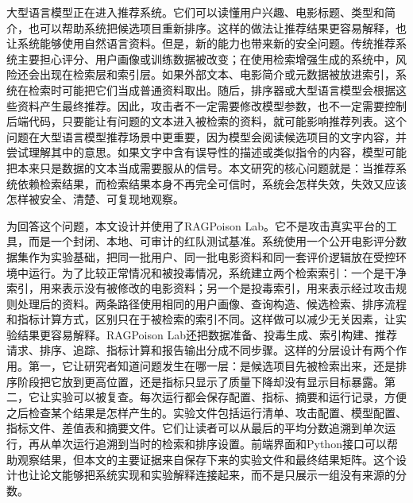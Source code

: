 大型语言模型正在进入推荐系统。它们可以读懂用户兴趣、电影标题、类型和简介，也可以帮助系统把候选项目重新排序。这样的做法让推荐结果更容易解释，也让系统能够使用自然语言资料。但是，新的能力也带来新的安全问题。传统推荐系统主要担心评分、用户画像或训练数据被改变；在使用检索增强生成的系统中，风险还会出现在检索层和索引层。如果外部文本、电影简介或元数据被放进索引，系统在检索时可能把它们当成普通资料取出。随后，排序器或大型语言模型会根据这些资料产生最终推荐。因此，攻击者不一定需要修改模型参数，也不一定需要控制后端代码，只要能让有问题的文本进入被检索的资料，就可能影响推荐列表。这个问题在大型语言模型推荐场景中更重要，因为模型会阅读候选项目的文字内容，并尝试理解其中的意思。如果文字中含有误导性的描述或类似指令的内容，模型可能把本来只是数据的文本当成需要服从的信号。本文研究的核心问题就是：当推荐系统依赖检索结果，而检索结果本身不再完全可信时，系统会怎样失效，失效又应该怎样被安全、清楚、可复现地观察。

为回答这个问题，本文设计并使用了RAGPoison Lab。它不是攻击真实平台的工具，而是一个封闭、本地、可审计的红队测试基准。系统使用一个公开电影评分数据集作为实验基础，把同一批用户、同一批电影资料和同一套评价逻辑放在受控环境中运行。为了比较正常情况和被投毒情况，系统建立两个检索索引：一个是干净索引，用来表示没有被修改的电影资料；另一个是投毒索引，用来表示经过攻击规则处理后的资料。两条路径使用相同的用户画像、查询构造、候选检索、排序流程和指标计算方式，区别只在于被检索的索引不同。这样做可以减少无关因素，让实验结果更容易解释。RAGPoison Lab还把数据准备、投毒生成、索引构建、推荐请求、排序、追踪、指标计算和报告输出分成不同步骤。这样的分层设计有两个作用。第一，它让研究者知道问题发生在哪一层：是候选项目先被检索出来，还是排序阶段把它放到更高位置，还是指标只显示了质量下降却没有显示目标暴露。第二，它让实验可以被复查。每次运行都会保存配置、指标、摘要和运行记录，方便之后检查某个结果是怎样产生的。实验文件包括运行清单、攻击配置、模型配置、指标文件、差值表和摘要文件。它们让读者可以从最后的平均分数追溯到单次运行，再从单次运行追溯到当时的检索和排序设置。前端界面和Python接口可以帮助观察结果，但本文的主要证据来自保存下来的实验文件和最终结果矩阵。这个设计也让论文能够把系统实现和实验解释连接起来，而不是只展示一组没有来源的分数。

